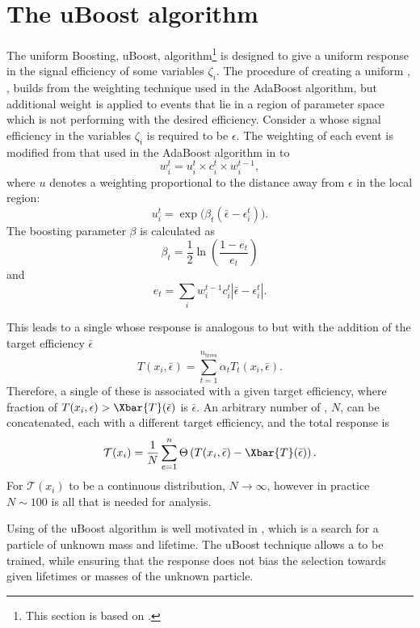 \section{The uBoost algorithm}
\label{sec:bdt:uboost}
The uniform Boosting, uBoost, algorithm\footnote{
  This section is based on .} is designed to give a uniform
response in the signal efficiency of some variables $\zeta_i$.
The procedure of creating a uniform \BDT, \uBDT, builds from the weighting technique used in the
AdaBoost algorithm, but additional weight is applied to events that lie in a region of parameter
space which is not performing with the desired efficiency.
Consider a \BDT whose signal efficiency in the variables $\zeta_i$ is required to be $\epsilon$.
The weighting of each event is modified from that used in the AdaBoost algorithm in 
to
\begin{equation}
  w_i^t = u_i^t\times c_i^t \times w_i^{t-1},
\end{equation}
where $u$ denotes a weighting proportional to the distance away from $\epsilon$ in the local
region:
\begin{equation}
  u_i^t = \exp\big(\beta_t(\bar\epsilon-\epsilon_i^t)\big).
\end{equation}
The boosting parameter $\beta$ is calculated as
\begin{equation}
  \beta_t = \frac12\ln\left(\frac{1-e_t}{e_t}\right)
\end{equation}
and
\begin{equation}
  e_t = \sum_i w_i^{t-1}c_i^t\left|\bar\epsilon-\epsilon_i^t\right|.
\end{equation}

This leads to a single \BDT whose response is analogous to  but with the addition
of the target efficiency $\bar\epsilon$
\begin{equation}
  T(x_i,\bar\epsilon) = \sum_{t=1}^{n_\mathrm{trees}} \alpha_tT_t(x_i,\bar\epsilon).
  \label{eq:ada:fullbdt}
\end{equation}
Therefore, a single of these \BDTs is associated with a given target efficiency, where
fraction of $T(x_i,\epsilon)>\Xbar{T}(\bar\epsilon)$ is $\bar\epsilon$.
An arbitrary number of \BDTs, $N$, can be concatenated, each with a different target efficiency, and
the total response is
\begin{equation}
  \mathcal{T}(x_i) =
  \frac1N\sum_{e=1}^{n}\Theta\left(T(x_i, \bar\epsilon) - \Xbar{T}(\bar\epsilon)\right).
\end{equation}
For $\mathcal{T}(x_i)$ to be a continuous distribution, $N\!\to\infty$, however in practice
$N\sim100$ is all that is needed for analysis.

Using of the uBoost algorithm is well motivated in , which is a search for a particle
of unknown mass and lifetime.
The uBoost technique allows a \BDT to be trained, while ensuring that the response does not bias
the selection towards given lifetimes or masses of the unknown particle.













